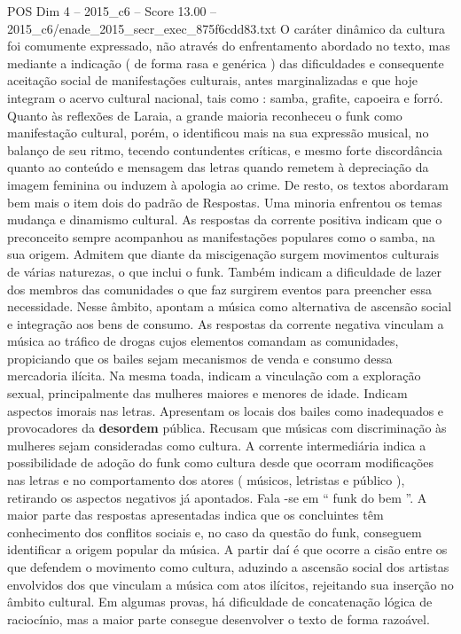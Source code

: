 \begin{textsample}{POS Dim 4 – 2015\_c6 – Score 13.00 – 2015\_c6/enade\_2015\_secr\_exec\_875f6cdd83.txt}
O caráter dinâmico da cultura foi comumente expressado, não através do enfrentamento abordado no texto, mas mediante a indicação ( de forma rasa e genérica ) das dificuldades e consequente aceitação social de manifestações culturais, antes marginalizadas e que hoje integram o acervo cultural nacional, tais como : samba, grafite, capoeira e forró.
Quanto às reflexões de Laraia, a grande maioria reconheceu o funk como manifestação cultural, porém, o identificou mais na sua expressão musical, no balanço de seu ritmo, tecendo contundentes críticas, e mesmo forte discordância quanto ao conteúdo e mensagem das letras quando remetem à depreciação da imagem feminina ou induzem à apologia ao crime.
De resto, os textos abordaram bem mais o item dois do padrão de Respostas.
Uma minoria enfrentou os temas mudança e dinamismo cultural.
As respostas da corrente positiva indicam que o preconceito sempre acompanhou as manifestações populares como o samba, na sua origem.
Admitem que diante da miscigenação surgem movimentos culturais de várias naturezas, o que inclui o funk.
Também indicam a dificuldade de lazer dos membros das comunidades o que faz surgirem eventos para preencher essa necessidade.
Nesse âmbito, apontam a música como alternativa de ascensão social e integração aos bens de consumo.
As respostas da corrente negativa vinculam a música ao tráfico de drogas cujos elementos comandam as comunidades, propiciando que os bailes sejam mecanismos de venda e consumo dessa mercadoria ilícita.
Na mesma toada, indicam a vinculação com a exploração sexual, principalmente das mulheres maiores e menores de idade.
Indicam aspectos imorais nas letras.
Apresentam os locais dos bailes como inadequados e provocadores da \textbf{desordem} pública.
Recusam que músicas com discriminação às mulheres sejam consideradas como cultura.
A corrente intermediária indica a possibilidade de adoção do funk como cultura desde que ocorram modificações nas letras e no comportamento dos atores ( músicos, letristas e público ), retirando os aspectos negativos já apontados.
Fala -se em “ funk do bem ”.
A maior parte das respostas apresentadas indica que os concluintes têm conhecimento dos conflitos sociais e, no caso da questão do funk, conseguem identificar a origem popular da música.
A partir daí é que ocorre a cisão entre os que defendem o movimento como cultura, aduzindo a ascensão social dos artistas envolvidos dos que vinculam a música com atos ilícitos, rejeitando sua inserção no âmbito cultural.
Em algumas provas, há dificuldade de concatenação lógica de raciocínio, mas a maior parte consegue desenvolver o texto de forma razoável.

\end{textsample}

